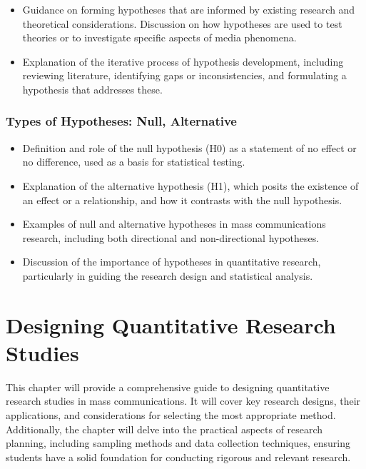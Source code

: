 \documentclass[
]{book}
\begin{document}
\begin{itemize}
\item
  Guidance on forming hypotheses that are informed by existing research and theoretical considerations. Discussion on how hypotheses are used to test theories or to investigate specific aspects of media phenomena.
\item
  Explanation of the iterative process of hypothesis development, including reviewing literature, identifying gaps or inconsistencies, and formulating a hypothesis that addresses these.
\end{itemize}

\hypertarget{types-of-hypotheses-null-alternative}{%
\subsection*{Types of Hypotheses: Null, Alternative}\label{types-of-hypotheses-null-alternative}}

\begin{itemize}
\item
  Definition and role of the null hypothesis (H0) as a statement of no effect or no difference, used as a basis for statistical testing.
\item
  Explanation of the alternative hypothesis (H1), which posits the existence of an effect or a relationship, and how it contrasts with the null hypothesis.
\item
  Examples of null and alternative hypotheses in mass communications research, including both directional and non-directional hypotheses.
\item
  Discussion of the importance of hypotheses in quantitative research, particularly in guiding the research design and statistical analysis.
\end{itemize}

\hypertarget{designing-quantitative-research-studies}{%
\chapter*{Designing Quantitative Research Studies}\label{designing-quantitative-research-studies}}

This chapter will provide a comprehensive guide to designing quantitative research studies in mass communications. It will cover key research designs, their applications, and considerations for selecting the most appropriate method. Additionally, the chapter will delve into the practical aspects of research planning, including sampling methods and data collection techniques, ensuring students have a solid foundation for conducting rigorous and relevant research.
\end{document}
